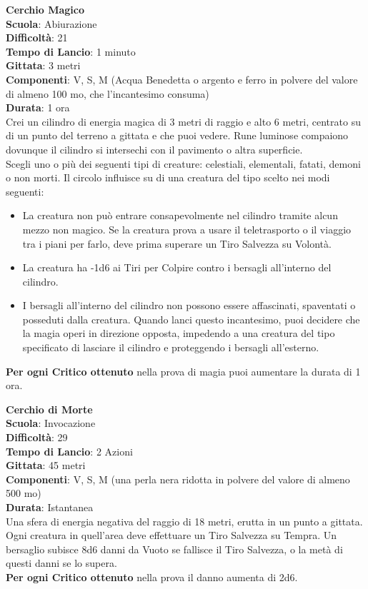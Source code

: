 \begin{multicols}{2}
\medskip\textbf{Cerchio Magico}\\
\textbf{Scuola}: Abiurazione\\
\textbf{Difficoltà}: 21\\
\textbf{Tempo di Lancio}: 1 minuto\\
\textbf{Gittata}: 3 metri\\
\textbf{Componenti}: V, S, M (Acqua Benedetta o argento e ferro in polvere del valore di almeno 100 mo, che l'incantesimo consuma)\\
\textbf{Durata}: 1 ora\\
Crei un cilindro di energia magica di 3 metri di raggio e alto 6 metri, centrato su di un punto del terreno a gittata e che puoi vedere. Rune luminose compaiono dovunque il cilindro si intersechi con il pavimento o altra superficie.\\
Scegli uno o più dei seguenti tipi di creature: celestiali, elementali, fatati, demoni o non morti. Il circolo influisce su di una creatura del tipo scelto nei modi seguenti:\\
\begin{itemize}
	\item 
La creatura non può entrare consapevolmente nel cilindro tramite alcun mezzo non magico. Se la creatura prova a usare il teletrasporto o il viaggio tra i piani per farlo, deve prima superare un Tiro Salvezza su Volontà.
	\item 
La creatura ha -1d6 ai Tiri per Colpire contro i bersagli all'interno del cilindro.
	\item 
I bersagli all'interno del cilindro non possono essere affascinati, spaventati o posseduti dalla creatura. Quando lanci questo incantesimo, puoi decidere che la magia operi in direzione opposta, impedendo a una creatura del tipo specificato di lasciare il cilindro e proteggendo i bersagli all'esterno.
\end{itemize}
\textbf{Per ogni Critico ottenuto} nella prova di magia puoi aumentare la durata di 1 ora.

\medskip\textbf{Cerchio di Morte}\\
\textbf{Scuola}: Invocazione\\
\textbf{Difficoltà}: 29\\
\textbf{Tempo di Lancio}: 2 Azioni\\
\textbf{Gittata}: 45 metri\\
\textbf{Componenti}: V, S, M (una perla nera ridotta in polvere del valore di almeno 500 mo)\\
\textbf{Durata}: Istantanea\\
Una sfera di energia negativa del raggio di 18 metri, erutta in un punto a gittata. Ogni creatura in quell'area deve effettuare un Tiro Salvezza su Tempra. Un bersaglio subisce 8d6 danni da Vuoto se fallisce il Tiro Salvezza, o la metà di questi danni se lo supera. \\
\textbf{Per ogni Critico ottenuto} nella prova il danno aumenta di 2d6.


\end{multicols}
